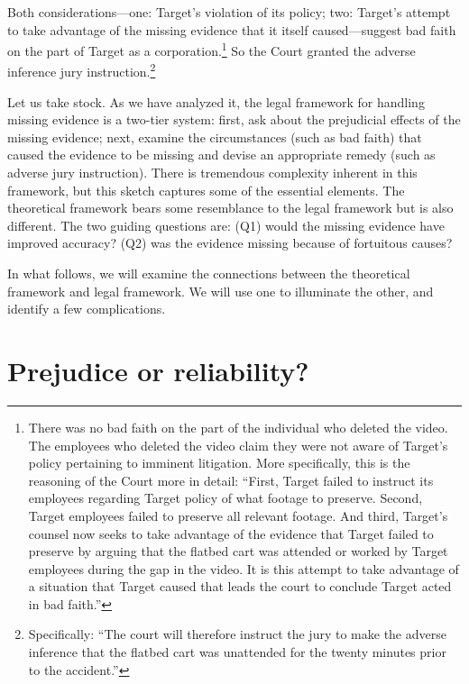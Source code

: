 \documentclass[
  10pt,
  dvipsnames,enabledeprecatedfontcommands]{scrartcl}
\begin{document}
\noindent Both considerations---one: Target's violation of its policy;
two: Target's attempt to take advantage of the missing evidence that it
itself caused---suggest bad faith on the part of Target as a
corporation.\footnote{There was no bad faith on the part of the
  individual who deleted the video. The employees who deleted the video
  claim they were not aware of Target's policy pertaining to imminent
  litigation. More specifically, this is the reasoning of the Court more
  in detail: ``First, Target failed to instruct its employees regarding
  Target policy of what footage to preserve. Second, Target employees
  failed to preserve all relevant footage. And third, Target's counsel
  now seeks to take advantage of the evidence that Target failed to
  preserve by arguing that the flatbed cart was attended or worked by
  Target employees during the gap in the video. It is this attempt to
  take advantage of a situation that Target caused that leads the court
  to conclude Target acted in bad faith.''} So the Court granted the
adverse inference jury instruction.\footnote{ Specifically: ``The court
  will therefore instruct the jury to make the adverse inference that
  the flatbed cart was unattended for the twenty minutes prior to the
  accident.''}

\vspace{4mm}

\noindent Let us take stock. As we have analyzed it, the legal framework
for handling missing evidence is a two-tier system: first, ask about the
prejudicial effects of the missing evidence; next, examine the
circumstances (such as bad faith) that caused the evidence to be missing
and devise an appropriate remedy (such as adverse jury instruction).
There is tremendous complexity inherent in this framework, but this
sketch captures some of the essential elements. The theoretical
framework bears some resemblance to the legal framework but is also
different. The two guiding questions are: (Q1) would the missing
evidence have improved accuracy? (Q2) was the evidence missing because
of fortuitous causes?

In what follows, we will examine the connections between the theoretical
framework and legal framework. We will use one to illuminate the other,
and identify a few complications.

\hypertarget{prejudice-or-reliability}{%
\section{Prejudice or reliability?}\label{prejudice-or-reliability}}
\end{document}
